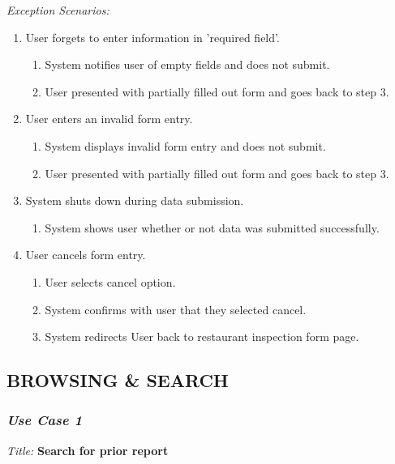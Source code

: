 \documentclass[twoside,letterpaper]{article}
\begin{document}
{\color{black} \textit{Exception Scenarios:}}
\begin{enumerate}
\item User forgets to enter information in 'required field'.
\begin{enumerate}
\item System notifies user of empty fields and does not submit.
\item User presented with partially filled out form and goes back to step 3.
\end{enumerate}

\item User enters an invalid form entry.
\begin{enumerate}
\item System displays invalid form entry and does not submit.
\item User presented with partially filled out form and goes back to step 3.
\end{enumerate}

\item System shuts down during data submission.
\begin{enumerate}
\item System shows user whether or not data was submitted successfully.
\end{enumerate}

\item User cancels form entry.
\begin{enumerate}
\item User selects cancel option.
\item System confirms with user that they selected cancel.
\item System redirects User back to restaurant inspection form page.
\end{enumerate}
\end{enumerate}

\subsection[BROWSING \& SEARCH]{\rmfamily\bfseries\color{black}
BROWSING \& SEARCH}

\subsubsection{\textit{Use Case 1}}

\textit{Title: }{\bfseries\color{black} Search for prior report}
\end{document}
